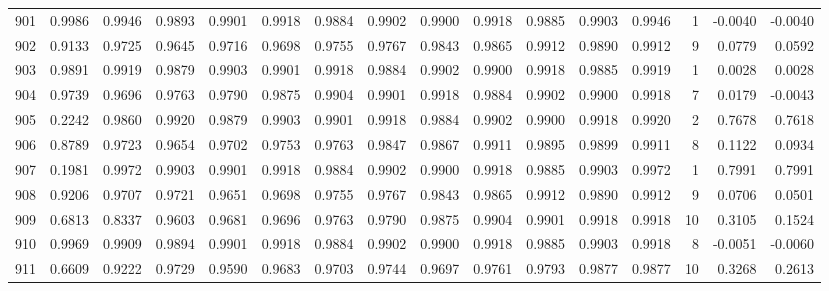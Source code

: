 \begin{tabular}{lrrrrrrrrrrrrrrr}
901 &      0.9986 &  0.9946 &  0.9893 &  0.9901 &  0.9918 &  0.9884 &  0.9902 &  0.9900 &  0.9918 &  0.9885 &   0.9903 &     0.9946 &      1 &                   -0.0040 &                    -0.0040 \\
902 &      0.9133 &  0.9725 &  0.9645 &  0.9716 &  0.9698 &  0.9755 &  0.9767 &  0.9843 &  0.9865 &  0.9912 &   0.9890 &     0.9912 &      9 &                    0.0779 &                     0.0592 \\
903 &      0.9891 &  0.9919 &  0.9879 &  0.9903 &  0.9901 &  0.9918 &  0.9884 &  0.9902 &  0.9900 &  0.9918 &   0.9885 &     0.9919 &      1 &                    0.0028 &                     0.0028 \\
904 &      0.9739 &  0.9696 &  0.9763 &  0.9790 &  0.9875 &  0.9904 &  0.9901 &  0.9918 &  0.9884 &  0.9902 &   0.9900 &     0.9918 &      7 &                    0.0179 &                    -0.0043 \\
905 &      0.2242 &  0.9860 &  0.9920 &  0.9879 &  0.9903 &  0.9901 &  0.9918 &  0.9884 &  0.9902 &  0.9900 &   0.9918 &     0.9920 &      2 &                    0.7678 &                     0.7618 \\
906 &      0.8789 &  0.9723 &  0.9654 &  0.9702 &  0.9753 &  0.9763 &  0.9847 &  0.9867 &  0.9911 &  0.9895 &   0.9899 &     0.9911 &      8 &                    0.1122 &                     0.0934 \\
907 &      0.1981 &  0.9972 &  0.9903 &  0.9901 &  0.9918 &  0.9884 &  0.9902 &  0.9900 &  0.9918 &  0.9885 &   0.9903 &     0.9972 &      1 &                    0.7991 &                     0.7991 \\
908 &      0.9206 &  0.9707 &  0.9721 &  0.9651 &  0.9698 &  0.9755 &  0.9767 &  0.9843 &  0.9865 &  0.9912 &   0.9890 &     0.9912 &      9 &                    0.0706 &                     0.0501 \\
909 &      0.6813 &  0.8337 &  0.9603 &  0.9681 &  0.9696 &  0.9763 &  0.9790 &  0.9875 &  0.9904 &  0.9901 &   0.9918 &     0.9918 &     10 &                    0.3105 &                     0.1524 \\
910 &      0.9969 &  0.9909 &  0.9894 &  0.9901 &  0.9918 &  0.9884 &  0.9902 &  0.9900 &  0.9918 &  0.9885 &   0.9903 &     0.9918 &      8 &                   -0.0051 &                    -0.0060 \\
911 &      0.6609 &  0.9222 &  0.9729 &  0.9590 &  0.9683 &  0.9703 &  0.9744 &  0.9697 &  0.9761 &  0.9793 &   0.9877 &     0.9877 &     10 &                    0.3268 &                     0.2613 \\

\end{tabular}
